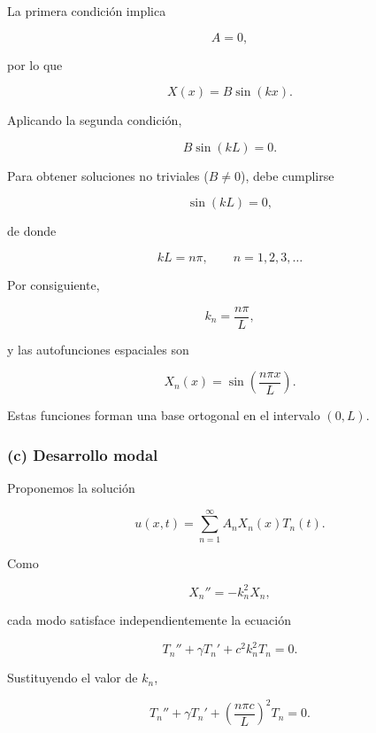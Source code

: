 \documentclass[12pt]{article}
\begin{document}
La primera condición implica

\[
A=0,
\]

por lo que

\begin{equation}
X(x)=B\sin(kx).
\end{equation}

Aplicando la segunda condición,

\[
B\sin(kL)=0.
\]

Para obtener soluciones no triviales ($B\neq0$), debe cumplirse

\begin{equation}
\sin(kL)=0,
\end{equation}

de donde

\begin{equation}
kL=n\pi,
\qquad
n=1,2,3,\ldots
\end{equation}

Por consiguiente,

\begin{equation}
k_n=\frac{n\pi}{L},
\end{equation}

y las autofunciones espaciales son

\begin{equation}
X_n(x)=
\sin\!\left(\frac{n\pi x}{L}\right).
\end{equation}

Estas funciones forman una base ortogonal en el intervalo $(0,L)$.

\subsubsection*{(c) Desarrollo modal}

Proponemos la solución

\begin{equation}
u(x,t)=
\sum_{n=1}^{\infty}
A_nX_n(x)T_n(t).
\end{equation}

Como

\[
X_n''=-k_n^2X_n,
\]

cada modo satisface independientemente la ecuación

\begin{equation}
T_n''+\gamma T_n'
+c^2k_n^2T_n=0.
\end{equation}

Sustituyendo el valor de $k_n$,

\begin{equation}
T_n''+\gamma T_n'
+\left(\frac{n\pi c}{L}\right)^2
T_n=0.
\end{equation}
\end{document}
